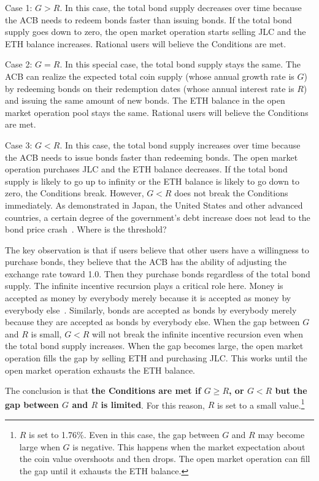 \documentclass[dvipdfmx,a4paper]{article}
\begin{document}
Case 1: $G>R$. In this case, the total bond supply decreases over time because the ACB needs to redeem bonds faster than issuing bonds. If the total bond supply goes down to zero, the open market operation starts selling JLC and the ETH balance increases. Rational users will believe the Conditions are met.

Case 2: $G=R$. In this special case, the total bond supply stays the same. The ACB can realize the expected total coin supply (whose annual growth rate is $G$) by redeeming bonds on their redemption dates (whose annual interest rate is $R$) and issuing the same amount of new bonds. The ETH balance in the open market operation pool stays the same. Rational users will believe the Conditions are met.

Case 3: $G<R$. In this case, the total bond supply increases over time because the ACB needs to issue bonds faster than redeeming bonds. The open market operation purchases JLC and the ETH balance decreases. If the total bond supply is likely to go up to infinity or the ETH balance is likely to go down to zero, the Conditions break. However, $G<R$ does not break the Conditions immediately. As demonstrated in Japan, the United States and other advanced countries, a certain degree of the government's debt increase does not lead to the bond price crash~\cite{elmendorf1999government}. Where is the threshold?

The key observation is that if users believe that other users have a willingness to purchase bonds, they believe that the ACB has the ability of adjusting the exchange rate toward 1.0. Then they purchase bonds regardless of the total bond supply. The infinite incentive recursion plays a critical role here. Money is accepted as money by everybody merely because it is accepted as money by everybody else~\cite{iwai1996boostrap,iwai1997evolution}. Similarly, bonds are accepted as bonds by everybody merely because they are accepted as bonds by everybody else. When the gap between $G$ and $R$ is small, $G<R$ will not break the infinite incentive recursion even when the total bond supply increases. When the gap becomes large, the open market operation fills the gap by selling ETH and purchasing JLC. This works until the open market operation exhausts the ETH balance.

The conclusion is that \textbf{the Conditions are met if $G\ge R$, or $G<R$ but the gap between $G$ and $R$ is limited}. For this reason, $R$ is set to a small value.\footnote{$R$ is set to 1.76\%. Even in this case, the gap between $G$ and $R$ may become large when $G$ is negative. This happens when the market expectation about the coin value overshoots and then drops. The open market operation can fill the gap until it exhausts the ETH balance.}
\end{document}
